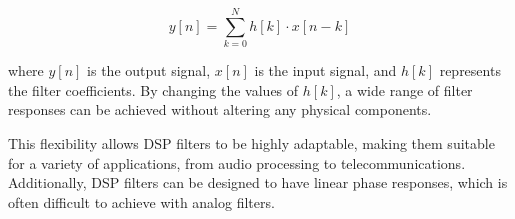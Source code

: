 \[
y[n] = \sum_{k=0}^{N} h[k] \cdot x[n-k]
\]

where \( y[n] \) is the output signal, \( x[n] \) is the input signal, and \( h[k] \) represents the filter coefficients. By changing the values of \( h[k] \), a wide range of filter responses can be achieved without altering any physical components.

This flexibility allows DSP filters to be highly adaptable, making them suitable for a variety of applications, from audio processing to telecommunications. Additionally, DSP filters can be designed to have linear phase responses, which is often difficult to achieve with analog filters.


